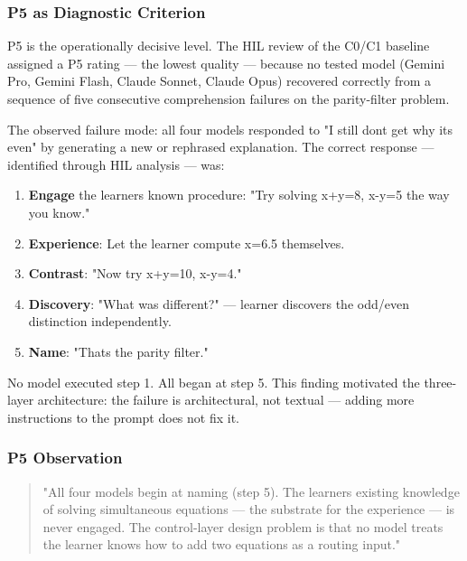 \documentclass[
]{article}
\providecommand{\tightlist}{%
  \setlength{\itemsep}{0pt}\setlength{\parskip}{0pt}}
\begin{document}
\subsubsection{P5 as Diagnostic Criterion}\label{p5-as-diagnostic-criterion}

P5 is the operationally decisive level. The HIL review of the C0/C1 baseline assigned a P5 rating --- the lowest quality --- because no tested model (Gemini Pro, Gemini Flash, Claude Sonnet, Claude Opus) recovered correctly from a sequence of five consecutive comprehension failures on the parity-filter problem.

The observed failure mode: all four models responded to "I still don\textquotesingle t get why it\textquotesingle s even" by generating a new or rephrased explanation. The correct response --- identified through HIL analysis --- was:

\begin{enumerate}
\def\labelenumi{\arabic{enumi}.}
\tightlist
\item
  \textbf{Engage} the learner\textquotesingle s known procedure: "Try solving x+y=8, x-y=5 the way you know."
\item
  \textbf{Experience}: Let the learner compute x=6.5 themselves.
\item
  \textbf{Contrast}: "Now try x+y=10, x-y=4."
\item
  \textbf{Discovery}: "What was different?" --- learner discovers the odd/even distinction independently.
\item
  \textbf{Name}: "That\textquotesingle s the parity filter."
\end{enumerate}

No model executed step 1. All began at step 5. This finding motivated the three-layer architecture: the failure is architectural, not textual --- adding more instructions to the prompt does not fix it.

\subsubsection{P5 Observation}\label{p5-observation}

\begin{quote}
"All four models begin at naming (step 5). The learner\textquotesingle s existing knowledge of solving simultaneous equations --- the substrate for the experience --- is never engaged. The control-layer design problem is that no model treats \textquotesingle the learner knows how to add two equations\textquotesingle{} as a routing input."
\end{quote}
\end{document}
